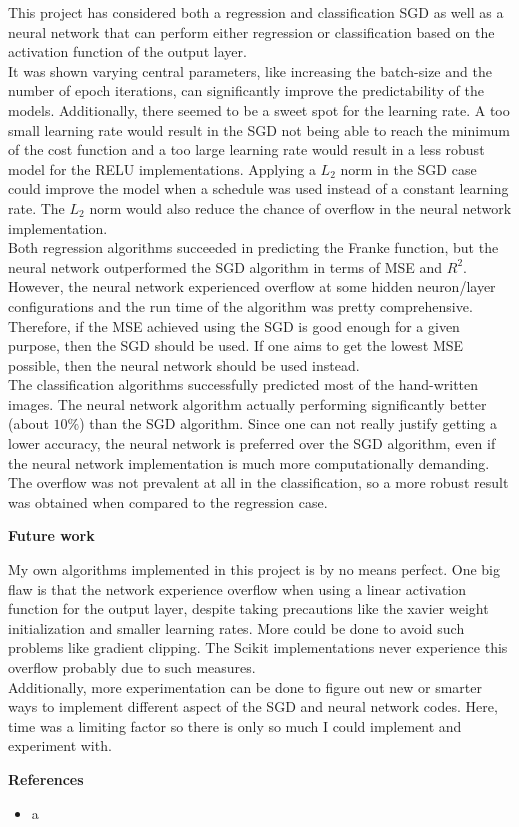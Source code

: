\documentclass[12pt,a4paper]{article}
\begin{document}
\noindent This project has considered both a regression and classification SGD as well as a neural network that can perform either regression or classification based on the activation function of the output layer. 
\\
It was shown varying central parameters, like increasing the batch-size and the number of epoch iterations, can significantly improve the predictability of the models. Additionally, there seemed to be a sweet spot for the learning rate. A too small learning rate would result in the SGD not being able to reach the minimum of the cost function and a too large learning rate would result in a less robust model for the RELU implementations. Applying a $L_2$ norm in the SGD case could improve the model when a schedule was used instead of a constant learning rate. The $L_2$ norm would also reduce the chance of overflow in the neural network implementation.
\\
Both regression algorithms succeeded in predicting the Franke function, but the neural network outperformed the SGD algorithm in terms of MSE and $R^2$. However, the neural network experienced overflow at some hidden neuron/layer configurations and the run time of the algorithm was pretty comprehensive. Therefore, if the MSE achieved using the SGD is good enough for a given purpose, then the SGD should be used. If one aims to get the lowest MSE possible, then the neural network should be used instead.
\\
The classification algorithms successfully predicted most of the hand-written images. The neural network algorithm actually performing significantly better (about $10\%$) than the SGD algorithm. Since one can not really justify getting a lower accuracy, the neural network is preferred over the SGD algorithm, even if the neural network implementation is much more computationally demanding. The overflow was not prevalent at all in the classification, so a more robust result was obtained when compared to the regression case. 

\newpage

\begin{center}
\Large{\textbf{Future work}}
\end{center}

\noindent My own algorithms implemented in this project is by no means perfect. One big flaw is that the network experience overflow when using a linear activation function for the output layer, despite taking precautions like the xavier weight initialization and smaller learning rates. More could be done to avoid such problems like gradient clipping. The Scikit implementations never experience this overflow probably due to such measures. 
\\
Additionally, more experimentation can be done to figure out new or smarter ways to implement different aspect of the SGD and neural network codes. Here, time was a limiting factor so there is only so much I could implement and experiment with.

\newpage

\begin{center}
\Large{\textbf{References}}
\end{center}

\begin{itemize}
  \item a
\end{itemize}
\end{document}
